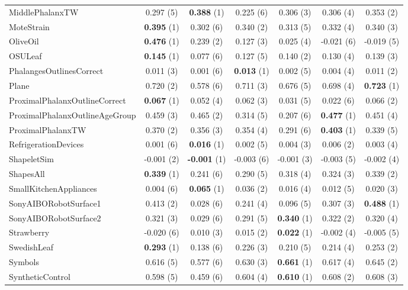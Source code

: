 \begin{table}[ht]
\begin{adjustbox}{width=\textwidth}
\begin{tabular}{lcccccc}
MiddlePhalanxTW & 0.297 (5) & \textbf{0.388} (1) & 0.225 (6) & 0.306 (3) & 0.306 (4) & 0.353 (2) \\
MoteStrain & \textbf{0.395} (1) & 0.302 (6) & 0.340 (2) & 0.313 (5) & 0.332 (4) & 0.340 (3) \\
OliveOil & \textbf{0.476} (1) & 0.239 (2) & 0.127 (3) & 0.025 (4) & -0.021 (6) & -0.019 (5) \\
OSULeaf & \textbf{0.145} (1) & 0.077 (6) & 0.127 (5) & 0.140 (2) & 0.130 (4) & 0.139 (3) \\
PhalangesOutlinesCorrect & 0.011 (3) & 0.001 (6) & \textbf{0.013} (1) & 0.002 (5) & 0.004 (4) & 0.011 (2) \\
Plane & 0.720 (2) & 0.578 (6) & 0.711 (3) & 0.676 (5) & 0.698 (4) & \textbf{0.723} (1) \\
ProximalPhalanxOutlineCorrect & \textbf{0.067} (1) & 0.052 (4) & 0.062 (3) & 0.031 (5) & 0.022 (6) & 0.066 (2) \\
ProximalPhalanxOutlineAgeGroup & 0.459 (3) & 0.465 (2) & 0.314 (5) & 0.207 (6) & \textbf{0.477} (1) & 0.451 (4) \\
ProximalPhalanxTW & 0.370 (2) & 0.356 (3) & 0.354 (4) & 0.291 (6) & \textbf{0.403} (1) & 0.339 (5) \\
RefrigerationDevices & 0.001 (6) & \textbf{0.016} (1) & 0.002 (5) & 0.004 (3) & 0.006 (2) & 0.003 (4) \\
ShapeletSim & -0.001 (2) & \textbf{-0.001} (1) & -0.003 (6) & -0.001 (3) & -0.003 (5) & -0.002 (4) \\
ShapesAll & \textbf{0.339} (1) & 0.241 (6) & 0.290 (5) & 0.318 (4) & 0.324 (3) & 0.339 (2) \\
SmallKitchenAppliances & 0.004 (6) & \textbf{0.065} (1) & 0.036 (2) & 0.016 (4) & 0.012 (5) & 0.020 (3) \\
SonyAIBORobotSurface1 & 0.413 (2) & 0.028 (6) & 0.241 (4) & 0.096 (5) & 0.307 (3) & \textbf{0.488} (1) \\
SonyAIBORobotSurface2 & 0.321 (3) & 0.029 (6) & 0.291 (5) & \textbf{0.340} (1) & 0.322 (2) & 0.320 (4) \\
Strawberry & -0.020 (6) & 0.010 (3) & 0.015 (2) & \textbf{0.022} (1) & -0.002 (4) & -0.005 (5) \\
SwedishLeaf & \textbf{0.293} (1) & 0.138 (6) & 0.226 (3) & 0.210 (5) & 0.214 (4) & 0.253 (2) \\
Symbols & 0.616 (5) & 0.577 (6) & 0.630 (3) & \textbf{0.661} (1) & 0.617 (4) & 0.645 (2) \\
SyntheticControl & 0.598 (5) & 0.459 (6) & 0.604 (4) & \textbf{0.610} (1) & 0.608 (2) & 0.608 (3) \\

\end{tabular}
\end{adjustbox}
\end{table}
